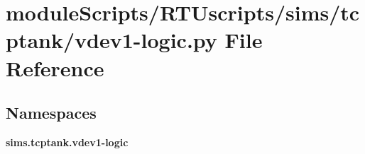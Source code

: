 \section{module\+Scripts/\+R\+T\+Uscripts/sims/tcptank/vdev1-\/logic.py File Reference}
\label{vdev1-logic_8py}
\subsection*{Namespaces}
\begin{DoxyCompactItemize}
\item 
 {\bf sims.\+tcptank.\+vdev1-\/logic}
\end{DoxyCompactItemize}
